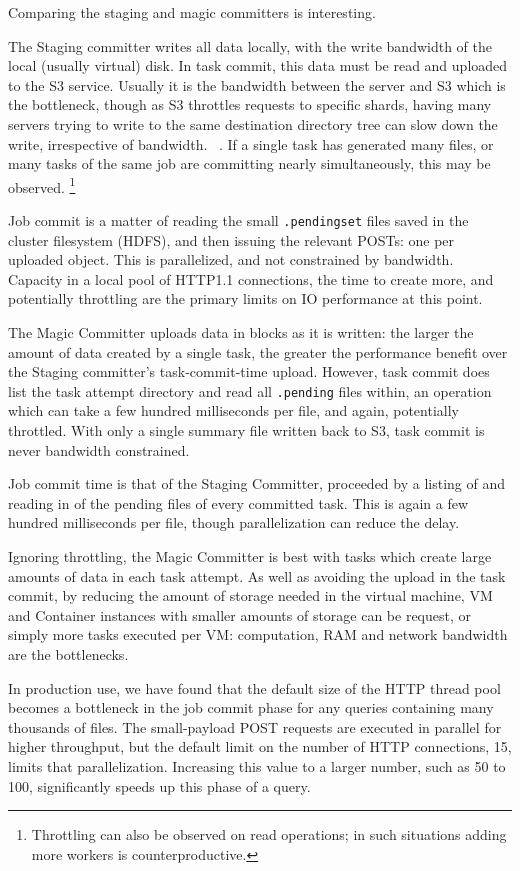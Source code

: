 \documentclass[conference]{IEEEtran}
\begin{document}
Comparing the staging and magic committers is interesting.

The Staging committer writes all data locally, with the write bandwidth
of the local (usually virtual) disk.
In task commit, this data must be read and uploaded to the S3 service.
Usually it is the bandwidth between the server and S3 which is the bottleneck,
though as S3 throttles requests to specific shards, having many servers trying
to write to the same destination directory tree can slow down the write, irrespective
of bandwidth.
\ \cite{AWS-S3-throttling}.
If a single task has generated many files, or many tasks of the same job are
committing nearly simultaneously, this may be observed.
\footnote{Throttling can also be observed on read operations;
in such situations adding more workers is counterproductive.}

Job commit is a matter of reading the small \texttt{.pendingset} files saved in the
cluster filesystem (HDFS), and then issuing the relevant POSTs: one per uploaded
object.
This is parallelized, and not constrained by bandwidth.
Capacity in a local pool of HTTP1.1 connections, the time to create more,
and potentially throttling are the primary limits on IO performance at this point.

The Magic Committer uploads data in blocks as it is written: the larger
the amount of data created by a single task, the greater the performance
benefit over the Staging committer's task-commit-time upload.
However, task commit does list the task attempt directory and read all \texttt{.pending}
files within, an operation which can take a few hundred milliseconds per file,
and again, potentially throttled.
With only a single summary file written back to S3, task commit is never
bandwidth constrained.

Job commit time is that of the Staging Committer, proceeded by a listing
of and reading in of the pending files of every committed task.
This is again a few hundred milliseconds per file, though parallelization
can reduce the delay.

Ignoring throttling, the Magic Committer is best with tasks which create
large amounts of data in each task attempt.
As well as avoiding the upload in the task commit, by reducing the
amount of storage needed in the virtual machine, VM and Container instances
with smaller amounts of storage can be request, or simply more tasks executed
per VM: computation, RAM and network bandwidth are the bottlenecks.

In production use, we have found that the default size of the HTTP thread
pool becomes a bottleneck in the job commit phase for any queries
containing many thousands of files.
The small-payload POST requests are executed in parallel for higher
throughput, but the default limit on the number of HTTP connections, 15, 
limits that parallelization.
Increasing this value to a larger number, such as 50 to 100, significantly
speeds up this phase of a query.
\end{document}
